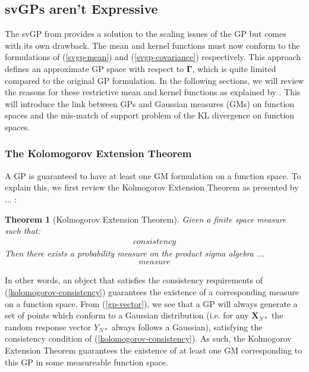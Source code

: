 \documentclass{article}
\newtheorem{theorem}{Theorem}
\numberwithin{equation}{section}
\begin{document}
\subsection{svGPs aren't Expressive}\label{section:svgp-problems}
The svGP from \cite{titsias2009variational} provides a solution to the scaling issues of the GP but comes with its own drawback. The mean and kernel functions must now conform to the formulations of (\ref{svgp-mean}) and (\ref{svgp-covariance}) respectively. This approach defines an approximate GP space with respect to $\mathbf{\Gamma}$, which is quite limited compared to the original GP formulation. In the following sections, we will review the reasons for these restrictive mean and kernel functions as explained by \cite{matthews2017scalable}. This will introduce the link between GPs and Gaussian measures (GMs) on function spaces and the mis-match of support problem of the KL divergence on function spaces. 

\subsubsection{The Kolomogorov Extension Theorem}
A GP is guaranteed to have at least one GM formulation on a function space. To explain this, we first review the Kolmogorov Extension Theorem as presented by ... :
\begin{theorem}[Kolmogorov Extension Theorem]
\label{kolomogorov-extension-theorem}
Given a finite space measure such that:
\begin{align}
    consistency 
    \label{kolomogorov-consistency}
\end{align}
Then there exists a probability measure on the product sigma algebra ... 
\begin{align}
    measure
    \label{kolomogorov-measure}
\end{align}
\end{theorem}
In other words, an object that satisfies the consistency requirements of (\ref{kolomogorov-consistency}) guarantees the existence of a corresponding measure on a function space. From (\ref{gp-vector}), we see that a GP will always generate a set of points which conform to a Gaussian distribution (i.e. for any $\mathbf{X}_{N*}$ the random response vector $Y_{N*}$ always follows a Gaussian), satisfying the consistency condition of (\ref{kolomogorov-consistency}). As such, the Kolmogorov Extension Theorem guarantees the existence of at least one GM corresponding to this GP in some measureable function space. 
\end{document}
